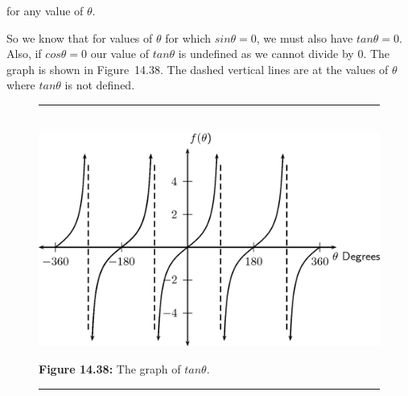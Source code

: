 for any value of $\theta $.\par 
So we know that for values of $\theta $ for which $sin\theta =0$, we must also have $tan\theta =0$. Also, if $cos\theta =0$ our value of $tan\theta $ is undefined as we cannot divide by 0. The graph is shown in Figure~14.38. The dashed vertical lines are at the values of $\theta $ where $tan\theta $ is not defined.\par 
\setcounter{subfigure}{0}
\begin{figure}[H] %
\begin{center}
\rule[.1in]{\figurerulewidth}{.005in} \\
\label{m39414*uid71!!!underscore!!!media}\label{m39414*uid71!!!underscore!!!printimage}\includegraphics{col11306.imgs/m39414_MG10C15_044.png} %
\vspace{2pt}
\vspace{\rubberspace}\par \begin{cnxcaption}
\small \textbf{Figure 14.38: }The graph of $tan\theta $.
\end{cnxcaption}
\vspace{.1in}
\rule[.1in]{\figurerulewidth}{.005in} \\
\end{center}
\end{figure}       

